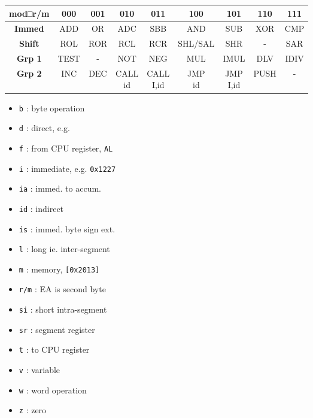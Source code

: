\begin{longtable}{|c|c|c|c|c|c|c|c|c|}
\hline
\textbf{mod□r/m} & \textbf{000} & \textbf{001} & \textbf{010} & \textbf{011} & \textbf{100} & \textbf{101} & \textbf{110} & \textbf{111} \\
\hline
\endhead
\hline
\endfoot
\hline
\endlastfoot
\textbf{Immed} & ADD & OR & ADC & SBB & AND & SUB & XOR & CMP \\
\hline
\textbf{Shift} & ROL & ROR & RCL & RCR & SHL/SAL & SHR & - & SAR \\
\hline
\textbf{Grp 1} & TEST & - & NOT & NEG & MUL & IMUL & DLV & IDIV \\
\hline
\textbf{Grp 2} & INC & DEC & \makecell{CALL\\id} & \makecell{CALL\\I,id} & \makecell{JMP\\id} & \makecell{JMP\\I,id} & PUSH & - \\
\hline

\end{longtable}

\begin{itemize}

\item\verb`b` : byte operation
\item\verb`d` : direct, e.g.
\item\verb`f` : from CPU register, \verb|AL|
\item\verb`i` : immediate, e.g. \verb|0x1227|
\item\verb`ia` : immed. to accum.
\item\verb`id` : indirect
\item\verb`is` : immed. byte sign ext.
\item\verb`l` : long ie. inter-segment
\item\verb`m` : memory, \verb|[0x2013]|
\item\verb`r/m` : EA is second byte
\item\verb`si` : short intra-segment
\item\verb`sr` : segment register
\item\verb`t` : to CPU register
\item\verb`v` : variable
\item\verb`w` : word operation
\item\verb`z` : zero
\end{itemize}

